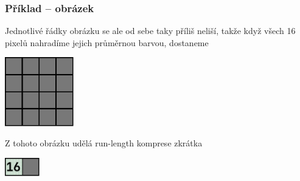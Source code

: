 \documentclass[aspectratio=169,11pt,svgnames,handout]{beamer}
\begin{document}
\begin{frame}
 \frametitle{Příklad -- obrázek}
 Jednotlivé řádky obrázku se ale od sebe taky příliš neliší, takže když všech 16
 pixelů nahradíme jejich průměrnou barvou, dostaneme
 \begin{center}
  \includegraphics[width=3cm]{lossy-4.pdf}
  \vspace*{-.5em}
 \end{center}
 \pause
 Z tohoto obrázku udělá run-length komprese zkrátka
 \begin{center}
  \includegraphics[width=1.5cm]{lossy-5.pdf}
  \vspace*{-.5em}
 \end{center}
\end{frame}
\end{document}
